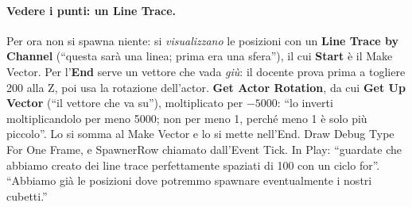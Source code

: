 \paragraph{Vedere i punti: un Line Trace.} Per ora non si spawna niente: si
\emph{visualizzano} le posizioni con un \textbf{Line Trace by Channel} (``questa sarà una
linea; prima era una sfera''), il cui \textbf{Start} è il Make Vector. Per l'\textbf{End}
serve un vettore che vada \emph{giù}: il docente prova prima a togliere 200 alla Z, poi
usa la rotazione dell'actor. \textbf{Get Actor Rotation}, da cui \textbf{Get Up Vector}
(``il vettore che va su''), moltiplicato per $-5000$: ``lo inverti moltiplicandolo per
meno 5000; non per meno 1, perché meno 1 è solo più piccolo''. Lo si somma al Make Vector
e lo si mette nell'End. Draw Debug Type For One Frame, e SpawnerRow chiamato dall'Event
Tick. In Play: ``guardate che abbiamo creato dei line trace perfettamente spaziati di 100
con un ciclo for''. ``Abbiamo già le posizioni dove potremmo spawnare eventualmente i
nostri cubetti.''


